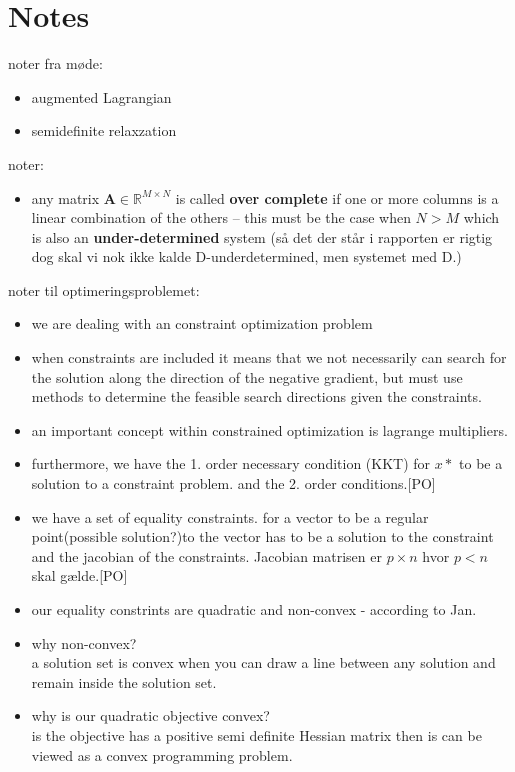 \section{Notes}
noter fra møde:
\begin{itemize}
\item augmented Lagrangian
\item semidefinite relaxzation 
\end{itemize}
noter:
\begin{itemize}
\item any matrix $\textbf{A}\in \mathbb{R}^{M\times N}$ is called \textbf{over complete} if one or more columns is a linear combination of the others -- this must be the case when $N>M$ which is also an \textbf{under-determined} system (så det der står i rapporten er rigtig dog skal vi nok ikke kalde D-underdetermined, men systemet med D.)
\end{itemize}
noter til optimeringsproblemet: 
\begin{itemize}
\item we are dealing with an constraint optimization problem
\item when constraints are included it means that we not necessarily can search for the solution along the direction of the negative gradient, but must use methods to determine the feasible search directions given the constraints.
\item an important concept within constrained optimization is lagrange multipliers. 
\item furthermore, we have the 1. order necessary condition (KKT) for $x*$ to be a solution to a constraint problem. and the 2. order conditions.[PO]
\item we have a set of equality constraints. for a vector to be a regular point(possible solution?)to the vector has to be a solution to the constraint and the jacobian of the constraints. Jacobian matrisen er $p \times n $ hvor $p<n$ skal gælde.[PO] 
\item our equality constrints are quadratic and non-convex - according to Jan. 
\item why non-convex? \\
a solution set is convex when you can draw a line between any solution and remain inside the solution set. 
\item why is our quadratic objective convex?\\
is the objective has a positive semi definite Hessian matrix then is can be viewed as a convex programming problem. \\
 
\end{itemize}